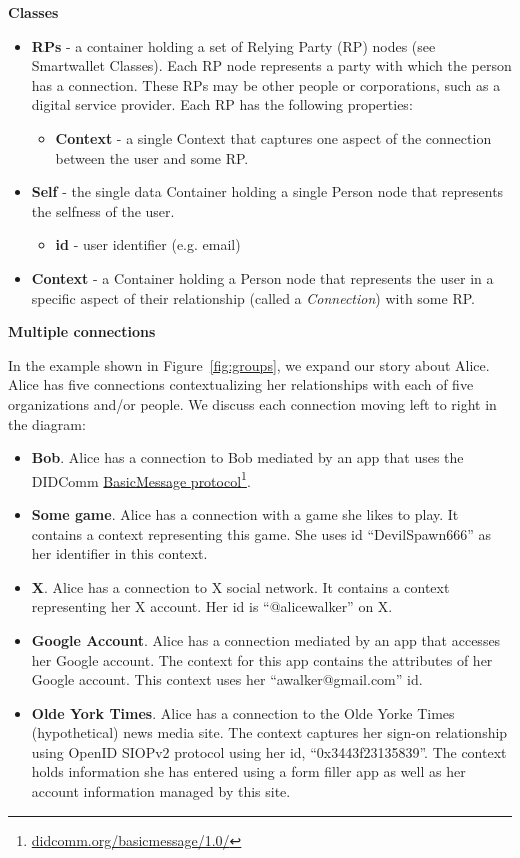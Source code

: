 \documentclass[11pt, oneside]{article}   	%
\newcommand{\hyperfootnote}[1][]{\def\ArgI{{#1}}\hyperfootnoteRelay}
\newcommand\hyperfootnoteRelay[2][]{\href{#1#2}{\ArgI}\footnote{\href{#1#2}{#2}}}
\begin{document}
\textbf{Classes}

\begin{itemize}
	\item \textbf{RPs} - a container holding a set of Relying Party (RP) nodes (see Smartwallet Classes). Each RP node represents a party with which the person has a connection. These RPs may be other people or corporations, such as a digital service provider. Each RP has the following properties:
	\begin{itemize}
		\item \textbf{Context} - a single Context that captures one aspect of the connection between the user and some RP.
	\end{itemize}
	\item \textbf{Self} - the single data Container holding a single Person node that represents the selfness of the user.
	\begin{itemize}
		\item \textbf{id} - user identifier (e.g. email)
	\end{itemize}
	\item \textbf{Context} - a Container holding a Person node that represents the user in a specific aspect of their relationship (called a \emph{Connection}) with some RP. 
\end{itemize}

\textbf{Multiple connections}

In the example shown in Figure~\ref{fig:groups}, we expand our story about Alice. Alice has five connections contextualizing her relationships with each of five organizations and/or people. We discuss each connection moving left to right in the diagram:

\begin{itemize}
	\item \textbf{Bob}. Alice has a connection to Bob mediated by an app that uses the DIDComm \hyperfootnote[BasicMessage protocol][https://]{didcomm.org/basicmessage/1.0/}.
	\item \textbf{Some game}. Alice has a connection with a game she likes to play. It contains a context representing this game. She uses id ``DevilSpawn666'' as her identifier in this context.  
	\item \textbf{X}. Alice has a connection to X social network. It contains a context representing her X account. Her id is ``@alicewalker'' on X.
	\item \textbf{Google Account}. Alice has a connection mediated by an app that accesses her Google account. The context for this app contains the attributes of her Google account. This context uses her ``awalker@gmail.com'' id. 
	\item \textbf{Olde York Times}. Alice has a connection to the Olde Yorke Times (hypothetical) news media site. The context captures her sign-on relationship using OpenID SIOPv2 protocol using her id, ``0x3443f23135839''. The context holds information she has entered using a form filler app as well as her account information managed by this site. 
\end{itemize}
\end{document}
